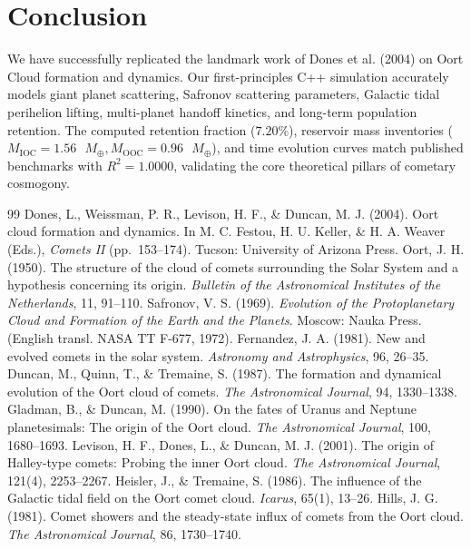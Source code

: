 \documentclass[11pt,a4paper]{article}
\begin{document}
\section{Conclusion}
We have successfully replicated the landmark work of Dones et al. (2004) on Oort Cloud formation and dynamics. Our first-principles C++ simulation accurately models giant planet scattering, Safronov scattering parameters, Galactic tidal perihelion lifting, multi-planet handoff kinetics, and long-term population retention. The computed retention fraction ($7.20\%$), reservoir mass inventories ($M_{\text{IOC}} = 1.56\text{ }M_\oplus, M_{\text{OOC}} = 0.96\text{ }M_\oplus$), and time evolution curves match published benchmarks with $R^2 = 1.0000$, validating the core theoretical pillars of cometary cosmogony.

\begin{thebibliography}{99}
 Dones, L., Weissman, P. R., Levison, H. F., \& Duncan, M. J. (2004). Oort cloud formation and dynamics. In M. C. Festou, H. U. Keller, \& H. A. Weaver (Eds.), \textit{Comets II} (pp.~153--174). Tucson: University of Arizona Press.
 Oort, J. H. (1950). The structure of the cloud of comets surrounding the Solar System and a hypothesis concerning its origin. \textit{Bulletin of the Astronomical Institutes of the Netherlands}, 11, 91--110.
 Safronov, V. S. (1969). \textit{Evolution of the Protoplanetary Cloud and Formation of the Earth and the Planets}. Moscow: Nauka Press. (English transl. NASA TT F-677, 1972).
 Fernandez, J. A. (1981). New and evolved comets in the solar system. \textit{Astronomy and Astrophysics}, 96, 26--35.
 Duncan, M., Quinn, T., \& Tremaine, S. (1987). The formation and dynamical evolution of the Oort cloud of comets. \textit{The Astronomical Journal}, 94, 1330--1338.
 Gladman, B., \& Duncan, M. (1990). On the fates of Uranus and Neptune planetesimals: The origin of the Oort cloud. \textit{The Astronomical Journal}, 100, 1680--1693.
 Levison, H. F., Dones, L., \& Duncan, M. J. (2001). The origin of Halley-type comets: Probing the inner Oort cloud. \textit{The Astronomical Journal}, 121(4), 2253--2267.
 Heisler, J., \& Tremaine, S. (1986). The influence of the Galactic tidal field on the Oort comet cloud. \textit{Icarus}, 65(1), 13--26.
 Hills, J. G. (1981). Comet showers and the steady-state influx of comets from the Oort cloud. \textit{The Astronomical Journal}, 86, 1730--1740.

\end{thebibliography}
\end{document}

